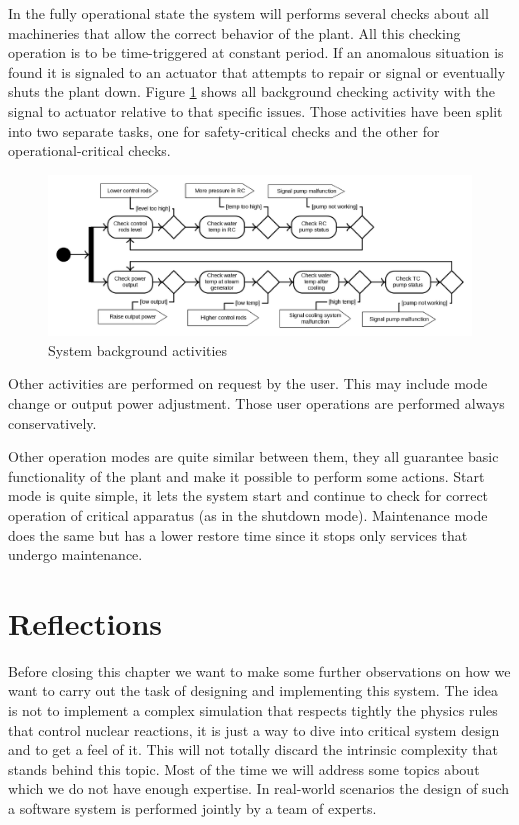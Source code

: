 \documentclass[10pt,a4paper]{report}
\begin{document}
In the fully operational state the system will performs several checks about all
machineries that allow the correct behavior of the plant. All this checking 
operation is to be time-triggered at constant period. If an anomalous situation 
is found it is signaled to an actuator that attempts to repair or signal or 
eventually shuts the plant down. Figure \ref{sysbackactive} shows all background 
checking activity with the signal to actuator relative to that specific issues. 
Those activities have been split into two separate tasks, one for safety-critical 
checks and the other for operational-critical checks.
\begin{figure}[htb]
\centering
\includegraphics[width=\textwidth]{diagrams/Arch_Activity}
\caption{System background activities}
\label{sysbackactive}
\end{figure}
Other activities are performed on request by the user. This may include
mode change or output power adjustment. Those user operations are performed 
always conservatively. 

Other operation modes are quite similar between them, they all guarantee basic 
functionality of the plant and make it possible to perform some actions. Start 
mode is quite simple, it lets the system start and continue to check for correct 
operation of critical apparatus (as in the shutdown mode). Maintenance mode does 
the same but has a lower restore time since it stops only services that undergo 
maintenance.

\section{Reflections}
Before closing this chapter we want to make some further observations on how 
we want to carry out the task of designing and implementing this system. The 
idea is not to implement a complex simulation that respects tightly the physics
rules that control nuclear reactions, it is just a way to dive into critical 
system design and to get a feel of it. This will not totally discard the 
intrinsic complexity that stands behind this topic. Most of the time we 
will address some topics about which we do not have enough expertise. In 
real-world scenarios the design of such a software system is performed jointly 
by a team of experts. 
\end{document}
